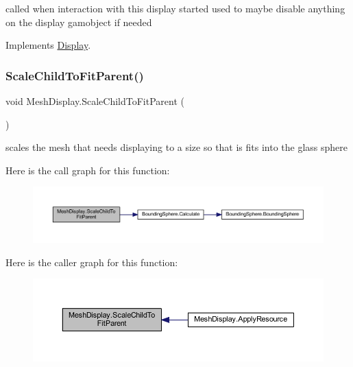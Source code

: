 called when interaction with this display started used to maybe disable anything on the display gamobject if needed 



Implements \mbox{\hyperlink{class_display_a21c51fcf185403197a78a5acfd2065de}{Display}}.

\mbox{\label{class_mesh_display_a94176ce6e76cc683336051b49573ab1f}} 
\subsubsection{\texorpdfstring{Scale\+Child\+To\+Fit\+Parent()}{ScaleChildToFitParent()}}
{\footnotesize\ttfamily void Mesh\+Display.\+Scale\+Child\+To\+Fit\+Parent (\begin{DoxyParamCaption}{ }\end{DoxyParamCaption})}



scales the mesh that needs displaying to a size so that is fits into the glass sphere 

Here is the call graph for this function\+:
\nopagebreak
\begin{figure}[H]
\begin{center}
\leavevmode
\includegraphics[width=350pt]{class_mesh_display_a94176ce6e76cc683336051b49573ab1f_cgraph}
\end{center}
\end{figure}
Here is the caller graph for this function\+:
\nopagebreak
\begin{figure}[H]
\begin{center}
\leavevmode
\includegraphics[width=350pt]{class_mesh_display_a94176ce6e76cc683336051b49573ab1f_icgraph}
\end{center}
\end{figure}
\mbox{\label{class_mesh_display_a8cd58e07cb9d64598c3bbc6701515d1d}} 
